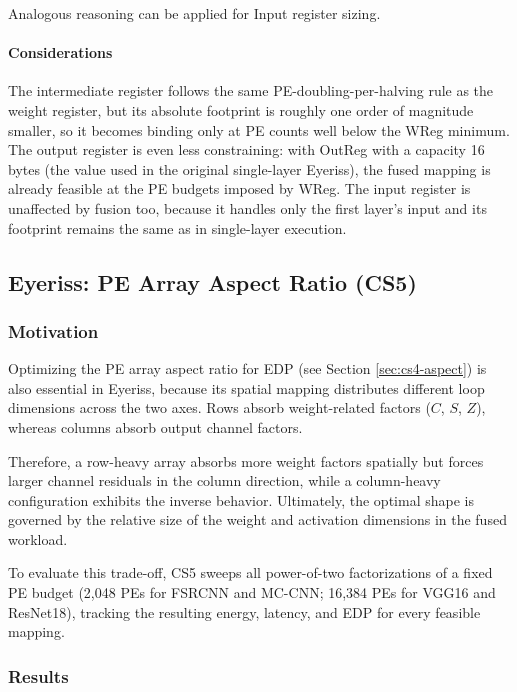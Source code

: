 Analogous reasoning can be applied for Input register sizing.


\paragraph{Considerations}
The intermediate register follows the same PE-doubling-per-halving
rule as the weight register, but its absolute footprint is roughly
one order of magnitude smaller, so it becomes binding only at PE
counts well below the WReg minimum.
The output register is even less constraining: with OutReg with a capacity 16 bytes
(the value used in the original single-layer Eyeriss), the fused
mapping is already feasible at the PE budgets imposed by WReg.
The input register is unaffected by fusion too, because it
handles only the first layer's input and its footprint remains the
same as in single-layer execution.
\subsection{Eyeriss: PE Array Aspect Ratio (CS5)}
\label{sec:eyeriss-cs5}

\subsubsection{Motivation}
Optimizing the PE array aspect ratio for EDP  (see Section \ref{sec:cs4-aspect}) is also essential in Eyeriss, because its spatial mapping distributes different loop dimensions across the two axes. Rows absorb weight-related factors ($C$, $S$, $Z$), whereas columns absorb output channel factors. 

Therefore, a row-heavy array absorbs more weight factors spatially but forces larger channel residuals in the column direction, while a column-heavy configuration exhibits the inverse behavior. Ultimately, the optimal shape is governed by the relative size of the weight and activation dimensions in the fused workload.

To evaluate this trade-off, CS5 sweeps all power-of-two factorizations of a fixed PE budget (2,048 PEs for FSRCNN and MC-CNN; 16,384 PEs for VGG16 and ResNet18), tracking the resulting energy, latency, and EDP for every feasible mapping. 


\subsubsection{Results}

